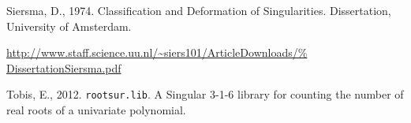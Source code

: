 \documentclass[noend]{amsproc}
\theoremstyle{definition}
\begin{document}
\begin{thebibliography}{99}
Siersma, D., 1974.
Classification and Deformation of Singularities.
Dissertation, University of Amsterdam.
{\par\raggedright
\url{http://www.staff.science.uu.nl/~siers101/ArticleDownloads/%
DissertationSiersma.pdf}
\par}

Tobis, E., 2012.
{\tt rootsur.lib}. {A} {\sc Singular} {3-1-6} library for counting the number
of real roots of a univariate polynomial.

\end{thebibliography}
\end{document}
